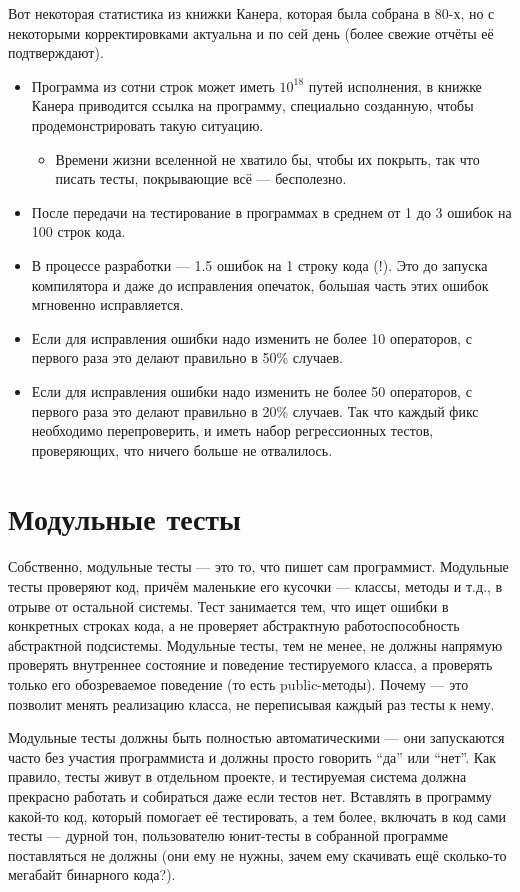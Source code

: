 \documentclass{../../text-style}
\begin{document}
Вот некоторая статистика из книжки Канера, которая была собрана в 80-х, но с некоторыми корректировками актуальна и по сей день (более свежие отчёты её подтверждают).

\begin{itemize}
    \item Программа из сотни строк может иметь $10^{18}$ путей исполнения, в книжке Канера приводится ссылка на программу, специально созданную, чтобы продемонстрировать такую ситуацию.
    \begin{itemize}
        \item Времени жизни вселенной не хватило бы, чтобы их покрыть, так что писать тесты, покрывающие всё --- бесполезно.
    \end{itemize}
    \item После передачи на тестирование в программах в среднем от 1 до 3 ошибок на 100 строк кода.
    \item В процессе разработки --- 1.5 ошибок на 1 строку кода (!). Это до запуска компилятора и даже до исправления опечаток, большая часть этих ошибок мгновенно исправляется.
    \item Если для исправления ошибки надо изменить не более 10 операторов, с первого раза это делают правильно в 50\% случаев.
    \item Если для исправления ошибки надо изменить не более 50 операторов, с первого раза это делают правильно в 20\% случаев. Так что каждый фикс необходимо перепроверить, и иметь набор регрессионных тестов, проверяющих, что ничего больше не отвалилось.
\end{itemize}

\section{Модульные тесты}

Собственно, модульные тесты --- это то, что пишет сам программист. Модульные тесты проверяют код, причём маленькие его кусочки --- классы, методы и т.д., в отрыве от остальной системы. Тест занимается тем, что ищет ошибки в конкретных строках кода, а не проверяет абстрактную работоспособность абстрактной подсистемы. Модульные тесты, тем не менее, не должны напрямую проверять внутреннее состояние и поведение тестируемого класса, а проверять только его обозреваемое поведение (то есть public-методы). Почему --- это позволит менять реализацию класса, не переписывая каждый раз тесты к нему.

Модульные тесты должны быть полностью автоматическими --- они запускаются часто без участия программиста и должны просто говорить \enquote{да} или \enquote{нет}. Как правило, тесты живут в отдельном проекте, и тестируемая система должна прекрасно работать и собираться даже если тестов нет. Вставлять в программу какой-то код, который помогает её тестировать, а тем более, включать в код сами тесты --- дурной тон, пользователю юнит-тесты в собранной программе поставляться не должны (они ему не нужны, зачем ему скачивать ещё сколько-то мегабайт бинарного кода?).
\end{document}
